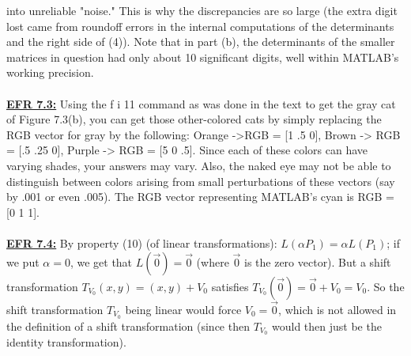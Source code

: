 \documentclass[../main.tex]{subfiles}
\begin{document}
into unreliable "noise." This is why the discrepancies are so large (the extra digit lost came from 
roundoff errors in the internal computations of the determinants and the right side of (4)). Note that in 
part (b), the determinants of the smaller matrices in question had only about 10 significant digits, well 
within MATLAB's working precision. 
\\
\\
\textbf{\underline{EFR 7.3:}} Using the f i 11 command as was done in the text to get the gray cat of Figure 7.3(b), you 
can get those other-colored cats by simply replacing the RGB vector for gray by the following: Orange 
->RGB = [1 .5 0], Brown -> RGB = [.5 .25 0], Purple -> RGB = [5 0 .5]. Since each of these 
colors can have varying shades, your answers may vary. Also, the naked eye may not be able to 
distinguish between colors arising from small perturbations of these vectors (say by .001 or even .005). 
The RGB vector representing MATLAB's cyan is RGB = [0 1 1].
\\
\\
\textbf{\underline{EFR 7.4:}} By property (10) (of linear transformations): $L\left(\alpha P_{1}\right)=\alpha L\left(P_{1}\right)$; if we put $\alpha=0$, we get that $L(\overrightarrow{0})=\overrightarrow{0}$ (where $\overrightarrow{0}$ is the zero vector). But a shift transformation $T_{V_{0}}(x, y)=(x, y)+V_{0}$ satisfies $T_{V_{0}}(\overrightarrow{0})=\overrightarrow{0}+V_{0}=V_{0}$. So the shift transformation $T_{V_{0}}$ being linear would force $V_{0}=\overrightarrow{0}$, which is not allowed in the definition of a shift transformation (since then $T_{V_{0}}$ would then just be the identity transformation).
\\
\\
\end{document}
